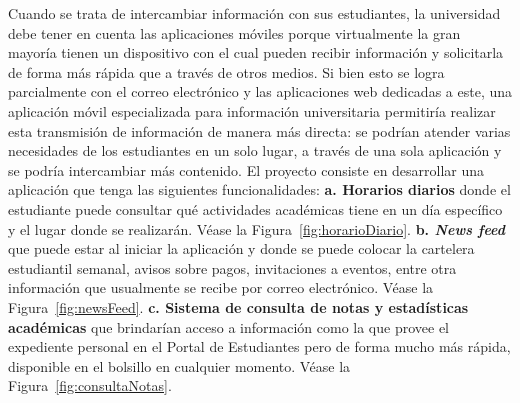 \documentclass[12pt]{article}
\begin{document}
Cuando se trata de intercambiar información con sus estudiantes, la universidad debe tener en cuenta las aplicaciones móviles porque virtualmente la gran mayor\'ia tienen un dispositivo con el cual pueden recibir información y solicitarla de forma más rápida que a través de otros medios. Si bien esto se logra parcialmente con el correo electrónico y las aplicaciones web dedicadas a este, una aplicación m\'ovil especializada para información universitaria permitiría realizar esta transmisi\'on de informaci\'on de manera más directa: se podrían atender varias necesidades de los estudiantes en un solo lugar, a través de una sola aplicación y se podría intercambiar más contenido.
\newline El proyecto consiste en desarrollar una aplicación que tenga las siguientes funcionalidades: 
\newline
\newline
\textbf{a. Horarios diarios} donde el estudiante puede consultar qué actividades académicas tiene en un día específico y el lugar donde se realizarán. Véase la Figura~\ref{fig:horarioDiario}.
\newline
\newline
\textbf{b. \textit{News feed}} que puede estar al iniciar la aplicación y donde se puede colocar la cartelera estudiantil semanal, avisos sobre pagos, invitaciones a eventos, entre otra información que usualmente se recibe por correo electrónico. Véase la Figura~\ref{fig:newsFeed}.  
\newline
\newline
\textbf{c. Sistema de consulta de notas y estadísticas académicas } que brindarían acceso a información como la que provee el expediente personal en el Portal de Estudiantes pero de forma mucho más rápida, disponible en el bolsillo en cualquier momento. Véase la Figura~\ref{fig:consultaNotas}.
\end{document}
